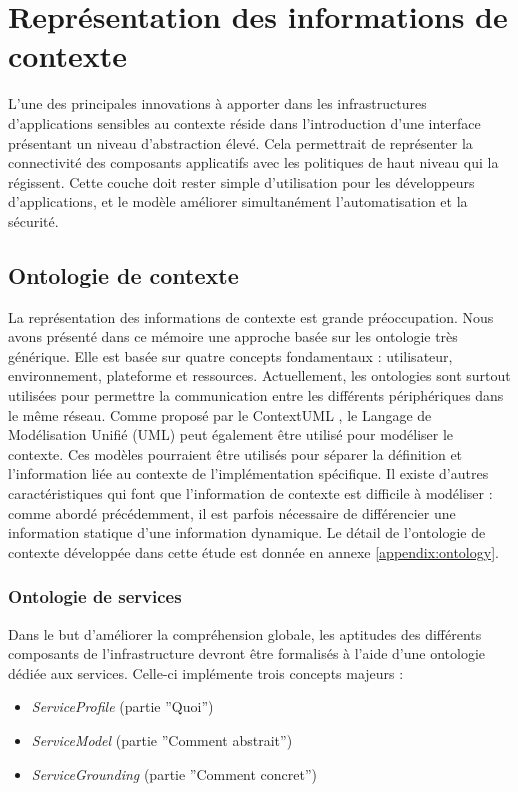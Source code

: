 \section{Représentation des informations de contexte}

L'une des principales innovations à apporter dans les infrastructures
d'applications sensibles au contexte réside dans l'introduction d'une interface
présentant un niveau d'abstraction élevé. Cela permettrait de représenter la
connectivité des composants applicatifs avec les politiques de haut niveau qui
la régissent. Cette couche doit rester simple d'utilisation pour les
développeurs d'applications, et le modèle améliorer simultanément
l'automatisation et la sécurité.

\subsection{Ontologie de contexte}

La représentation des informations de contexte est grande préoccupation. Nous
avons présenté dans ce mémoire une approche basée sur les ontologie très
générique. Elle est basée sur quatre concepts fondamentaux : utilisateur,
environnement, plateforme et ressources. Actuellement, les ontologies sont
surtout utilisées pour permettre la communication entre les différents
périphériques dans le même réseau. Comme proposé par le ContextUML
\cite{sheng_contextuml:_2005}, le Langage de Modélisation Unifié (UML) peut
également être utilisé pour modéliser le contexte. Ces modèles pourraient être
utilisés pour séparer la définition et l'information liée au contexte de
l'implémentation spécifique. Il existe d'autres caractéristiques qui font que
l'information de contexte est difficile à modéliser : comme abordé précédemment,
il est parfois nécessaire de différencier une information statique d'une
information dynamique. Le détail de l'ontologie de contexte développée dans
cette étude est donnée en annexe \ref{appendix:ontology}.

\subsubsection{Ontologie de services}

Dans le but d'améliorer la compréhension globale, les aptitudes des différents
composants de l'infrastructure devront être formalisés à l'aide d'une ontologie
dédiée aux services. Celle-ci implémente trois concepts majeurs :

\begin{itemize}
    \item \emph{ServiceProfile} (partie ''Quoi'')
    \item \emph{ServiceModel} (partie ''Comment abstrait'')
    \item \emph{ServiceGrounding} (partie ''Comment concret'')
\end{itemize}

